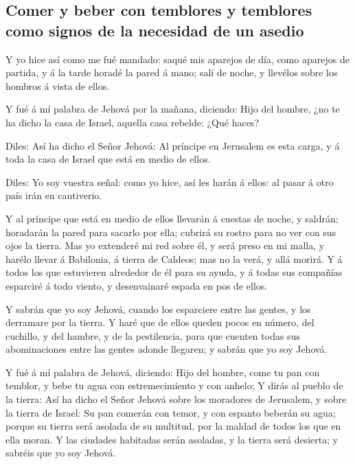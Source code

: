 \hypertarget{comer-y-beber-con-temblores-y-temblores-como-signos-de-la-necesidad-de-un-asedio}{%
\subsection{Comer y beber con temblores y temblores como signos de la
necesidad de un
asedio}\label{comer-y-beber-con-temblores-y-temblores-como-signos-de-la-necesidad-de-un-asedio}}

 Y yo hice así como me fué mandado: saqué mis aparejos de
día, como aparejos de partida, y á la tarde horadé la pared á mano; salí
de noche, y llevélos sobre los hombros á vista de ellos.

 Y fué á mí palabra de Jehová por la mañana, diciendo:
 Hijo del hombre, ¿no te ha dicho la casa de Israel,
aquella casa rebelde: ¿Qué haces?

 Diles: Así ha dicho el Señor Jehová: Al príncipe en
Jerusalem es esta carga, y á toda la casa de Israel que está en medio de
ellos.

 Diles: Yo soy vuestra señal: como yo hice, así les harán
á ellos: al pasar á otro país irán en cautiverio.

 Y al príncipe que está en medio de ellos llevarán á
cuestas de noche, y saldrán; horadarán la pared para sacarlo por ella;
cubrirá su rostro para no ver con sus ojos la tierra. 
Mas yo extenderé mi red sobre él, y será preso en mi malla, y harélo
llevar á Babilonia, á tierra de Caldeos; mas no la verá, y allá morirá.
 Y á todos los que estuvieren alrededor de él para su
ayuda, y á todas sus compañías esparciré á todo viento, y desenvainaré
espada en pos de ellos.

 Y sabrán que yo soy Jehová, cuando los esparciere entre
las gentes, y los derramare por la tierra.  Y haré que de
ellos queden pocos en número, del cuchillo, y del hambre, y de la
pestilencia, para que cuenten todas sus abominaciones entre las gentes
adonde llegaren; y sabrán que yo soy Jehová.

 Y fué á mí palabra de Jehová, diciendo: 
Hijo del hombre, come tu pan con temblor, y bebe tu agua con
estremecimiento y con anhelo;  Y dirás al pueblo de la
tierra: Así ha dicho el Señor Jehová sobre los moradores de Jerusalem, y
sobre la tierra de Israel: Su pan comerán con temor, y con espanto
beberán su agua; porque su tierra será asolada de su multitud, por la
maldad de todos los que en ella moran.  Y las ciudades
habitadas serán asoladas, y la tierra será desierta; y sabréis que yo
soy Jehová.

